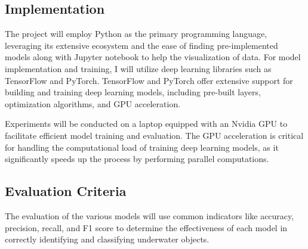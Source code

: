 \subsection{Implementation}

The project will employ Python as the primary programming language,
leveraging its extensive ecosystem and the ease of finding pre-implemented
models along with Jupyter notebook to help the visualization of data.
For model implementation and training, I will utilize deep learning
libraries such as TensorFlow and PyTorch. TensorFlow and PyTorch offer extensive support for building and training deep learning models, including pre-built layers, optimization algorithms, and GPU acceleration.

Experiments will be conducted on a laptop equipped with an Nvidia GPU
to facilitate efficient model training and evaluation.
The GPU acceleration is critical for handling the computational load of training
deep learning models, as it significantly speeds up the process by performing parallel computations.

\subsection{Evaluation Criteria}

The evaluation of the various models will use common indicators like accuracy, precision,
recall, and F1 score to determine the effectiveness of each model in correctly
identifying and classifying underwater objects.

